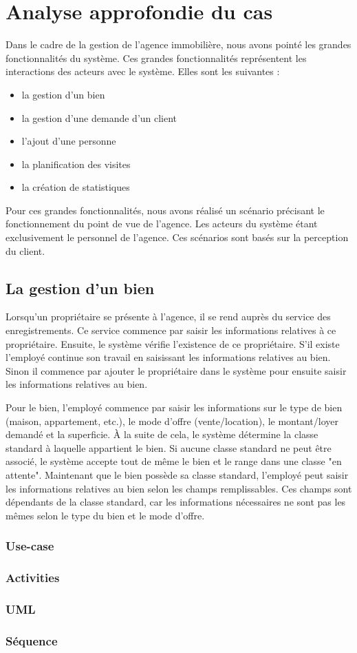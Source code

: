 \section{Analyse approfondie du cas}
Dans le cadre de la gestion de l'agence immobilière, nous avons pointé les grandes fonctionnalités du système. Ces grandes fonctionnalités représentent les interactions des acteurs avec le système.
Elles sont les suivantes :
\begin{itemize}
	\item la gestion d'un bien
	\item la gestion d'une demande d'un client
	\item l'ajout d'une personne
	\item la planification des visites
	\item la création de statistiques
\end{itemize}
Pour ces grandes fonctionnalités, nous avons réalisé un scénario précisant le fonctionnement du point de vue de l'agence. Les acteurs du système étant exclusivement le personnel de l'agence.
Ces scénarios sont basés sur la perception du client.
\subsection{La gestion d'un bien}
Lorsqu'un propriétaire se présente à l'agence, il se rend auprès du service des enregistrements.
Ce service commence par saisir les informations relatives à ce propriétaire.
Ensuite, le système vérifie l'existence de ce propriétaire. S'il existe l'employé continue son travail en saisissant les informations relatives au bien. Sinon il commence par ajouter le propriétaire dans le système pour ensuite saisir les informations relatives au bien.

Pour le bien, l'employé commence par saisir les informations sur le type de bien (maison, appartement, etc.), le mode d'offre (vente/location), le montant/loyer demandé et la superficie.
À la suite de cela, le système détermine la classe standard à laquelle appartient le bien.
Si aucune classe standard ne peut être associé, le système accepte tout de même le bien et le range dans une classe "en attente".
Maintenant que le bien possède sa classe standard, l'employé peut saisir les informations relatives au bien selon les champs remplissables.
Ces champs sont dépendants de la classe standard, car les informations nécessaires ne sont pas les mêmes selon le type du bien et le mode d'offre.
\subsubsection{Use-case}
\subsubsection{Activities}
\subsubsection{UML}
\subsubsection{Séquence}